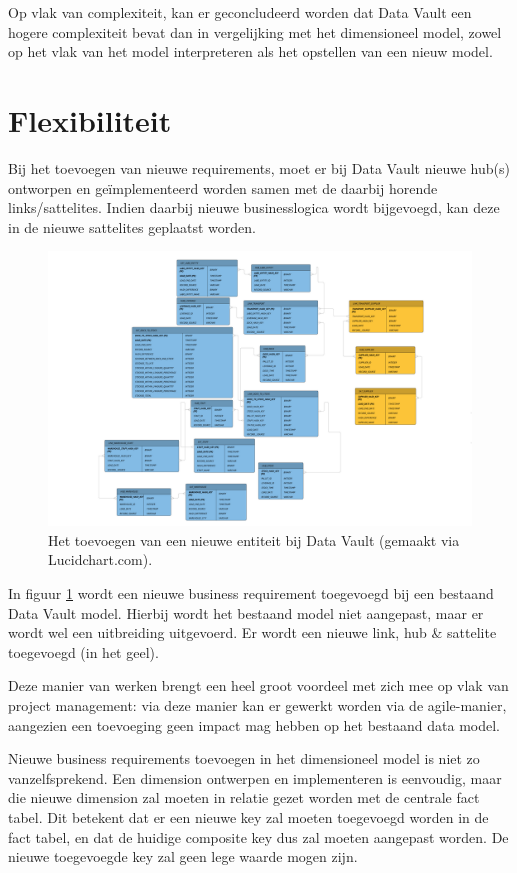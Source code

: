 Op vlak van complexiteit, kan er geconcludeerd worden dat Data Vault een hogere complexiteit bevat dan in vergelijking met het dimensioneel model, zowel op het vlak van het model interpreteren als het opstellen van een nieuw model.

\section{Flexibiliteit}
Bij het toevoegen van nieuwe requirements, moet er bij Data Vault nieuwe hub(s) ontworpen en geïmplementeerd worden samen met de daarbij horende links/sattelites. Indien daarbij nieuwe businesslogica wordt bijgevoegd, kan deze in de nieuwe sattelites geplaatst worden. 

\begin{figure}[h]
	\centering
	\includegraphics[scale=0.35]{../images/changedv.png}
	\caption{Het toevoegen van een nieuwe entiteit bij Data Vault (gemaakt via Lucidchart.com).}
	\label{fig:changedv}
\end{figure}

In figuur \ref{fig:changedv} wordt een nieuwe business requirement toegevoegd bij een bestaand Data Vault model. Hierbij wordt het bestaand model niet aangepast, maar er wordt wel een uitbreiding uitgevoerd. Er wordt een nieuwe link, hub \& sattelite toegevoegd (in het geel).

Deze manier van werken brengt een heel groot voordeel met zich mee op vlak van project management: via deze manier kan er gewerkt worden via de agile-manier, aangezien een toevoeging geen impact mag hebben op het bestaand data model.

Nieuwe business requirements toevoegen in het dimensioneel model is niet zo vanzelfsprekend. Een dimension ontwerpen en implementeren is eenvoudig, maar die nieuwe dimension zal moeten in relatie gezet worden met de centrale fact tabel. Dit betekent dat er een nieuwe key zal moeten toegevoegd worden in de fact tabel, en dat de huidige composite key dus zal moeten aangepast worden. De nieuwe toegevoegde key zal geen lege waarde mogen zijn.

